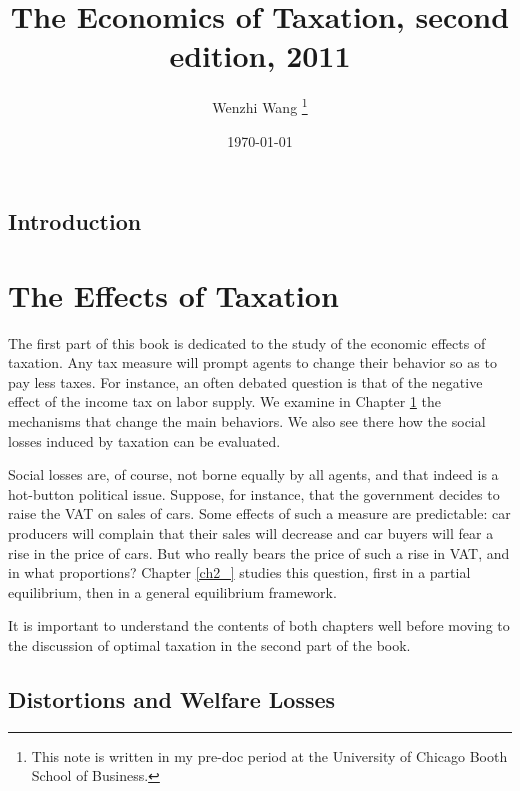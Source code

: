 \documentclass[12pt]{report}
\theoremstyle{definition}
\begin{document}
 


\title{\bf The Economics of Taxation, second edition, 2011} 
\author{Wenzhi Wang \thanks{This note is written in my pre-doc period at the University of Chicago Booth School of Business.} } 
\date{\today} 
\maketitle 

\tableofcontents

\chapter*{Introduction}

\part{The Effects of Taxation}

The first part of this book is dedicated to the study of the economic effects of taxation. Any tax measure will prompt agents to change their behavior so as to pay less taxes. For instance, an often debated question is that of the negative effect of the income tax on labor supply. We examine in Chapter \ref{ch1_distortions_welfarelosses} the mechanisms that change the main behaviors. We also see there how the social losses induced by taxation can be evaluated.

Social losses are, of course, not borne equally by all agents, and that indeed is a hot-button political issue. Suppose, for instance, that the government decides to raise the VAT on sales of cars. Some effects of such a measure are predictable: car producers will complain that their sales will decrease and car buyers will fear a rise in the price of cars. But who really bears the price of such a rise in VAT, and in what proportions? Chapter \ref{ch2_} studies this question, first in a partial equilibrium, then in a general equilibrium framework.

It is important to understand the contents of both chapters well before moving to the discussion of optimal taxation in the second part of the book.

\chapter{Distortions and Welfare Losses} \label{ch1_distortions_welfarelosses}
\end{document}
